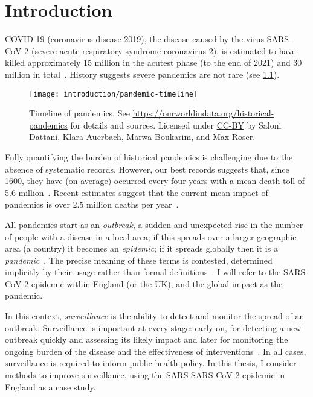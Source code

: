 \documentclass[thesis.tex]{subfiles}
\begin{document}
\chapter{Introduction} \label{intro}

COVID-19 (coronavirus disease 2019), the disease caused by the virus SARS-CoV-2 (severe acute respiratory syndrome coronavirus 2), is estimated to have killed approximately 15 million in the acutest phase (to the end of 2021) and 30 million in total~\autocite{whoCOVIDExcess,economistCOVIDExcess}.
History suggests severe pandemics are not rare (see \cref{intro:fig:pandemic-timeline}).
\begin{figure}
    \texttt{[image: introduction/pandemic-timeline]}
    \caption[Timeline of pandemics.]{%
        Timeline of pandemics.
        See \url{https://ourworldindata.org/historical-pandemics} for details and sources.
        Licensed under \href{https://creativecommons.org/licenses/by/4.0/}{CC-BY} by Saloni Dattani, Klara Auerbach, Marwa Boukarim, and Max Roser.
    }
    \label{intro:fig:pandemic-timeline}
\end{figure}
Fully quantifying the burden of historical pandemics is challenging due to the absence of systematic records.
However, our best records suggests that, since 1600, they have (on average) occurred every four years with a mean death toll of 5.6 million~\autocite{maraniNovelEpidemics}.
Recent estimates suggest that the current mean impact of pandemics is over 2.5 million deaths per year~\autocite{madhavPandemicMortality}.

All pandemics start as an \emph{outbreak}, a sudden and unexpected rise in the number of people with a disease in a local area; if this spreads over a larger geographic area (\eg a country) it becomes an \emph{epidemic}; if it spreads globally then it is a \emph{pandemic}~\autocite{grennanPandemic}.
The precise meaning of these terms is contested, determined implicitly by their usage rather than formal definitions~\autocite{morensPandemic,doshiElusive}.
I will refer to the SARS-CoV-2 epidemic within England (or the UK), and the global impact as the pandemic.

In this context, \emph{surveillance} is the ability to detect and monitor the spread of an outbreak.
Surveillance is important at every stage: early on, for detecting a new outbreak quickly and assessing its likely impact and later for monitoring the ongoing burden of the disease and the effectiveness of interventions~\autocite{whoFluSurveillance}.
In all cases, surveillance is required to inform public health policy.
In this thesis, I consider methods to improve surveillance, using the SARS-SARS-CoV-2 epidemic in England as a case study.
\end{document}
